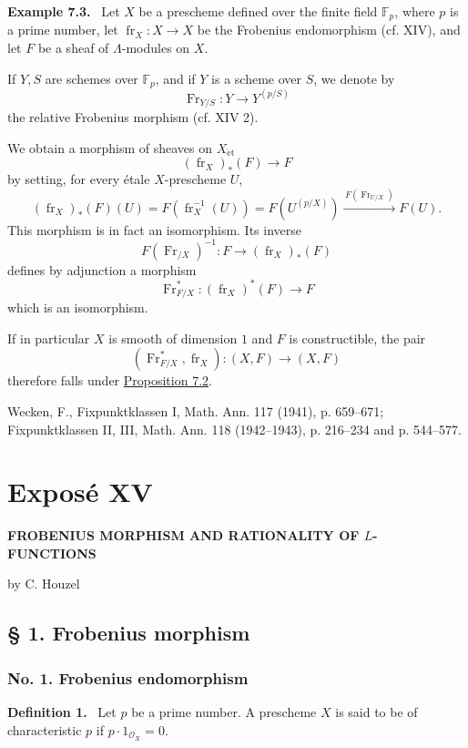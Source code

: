 \documentclass[11pt]{article}
\newenvironment{statement}[1]{\par\medskip\noindent\textbf{#1.}\ }{\par\medskip}
\providecommand{\et}{\mathrm{\acute{e}t}}
\providecommand{\OO}{\mathcal{O}}
\providecommand{\fr}{\operatorname{fr}}
\providecommand{\Fr}{\operatorname{Fr}}
\providecommand{\Fr}{\operatorname{Fr}}
\providecommand{\fr}{\operatorname{fr}}
\providecommand{\et}{\acute{e}t}
\begin{document}
\label{sga5:XII:example:7.3}\begin{statement}{Example 7.3}
Let $X$ be a prescheme defined over the finite field $\mathbb F_p$, where $p$ is a prime number, let $\fr_X:X\to X$ be the Frobenius endomorphism (cf. XIV), and let $F$ be a sheaf of $\Lambda$-modules on $X$.

If $Y,S$ are schemes over $\mathbb F_p$, and if $Y$ is a scheme over $S$, we denote by
\[
\Fr_{Y/S}:Y\longrightarrow Y^{(p/S)}
\]
the relative Frobenius morphism (cf. XIV 2).

We obtain a morphism of sheaves on $X_{\et}$
\[
(\fr_X)_*(F)\longrightarrow F
\]
by setting, for every étale $X$-prescheme $U$,
\[
(\fr_X)_*(F)(U)=F(\fr_X^{-1}(U))=F(U^{(p/X)})
 \xrightarrow{\,F(\Fr_{U/X})\,}F(U).
\]
This morphism is in fact an isomorphism. Its inverse
\[
F(\Fr_{/X})^{-1}:F\longrightarrow (\fr_X)_*(F)
\]
defines by adjunction a morphism
\[
\Fr_{F/X}^*:(\fr_X)^*(F)\longrightarrow F
\]
which is an isomorphism.

If in particular $X$ is smooth of dimension $1$ and $F$ is constructible, the pair
\[
(\Fr_{F/X}^*,\fr_X):(X,F)\longrightarrow (X,F)
\]
therefore falls under \hyperref[sga5:XII:proposition:7.2]{Proposition 7.2}.
\end{statement}

\noindent[1] Wecken, F., Fixpunktklassen I, Math. Ann. 117 (1941), p. 659--671; Fixpunktklassen II, III, Math. Ann. 118 (1942--1943), p. 216--234 and p. 544--577.

\label{sga5:XV:expose:xv}\section*{Exposé XV}
\begin{center}
\Large\bfseries FROBENIUS MORPHISM AND RATIONALITY OF $L$-FUNCTIONS

\medskip
by C. Houzel
\end{center}

\subsection*{§ 1. Frobenius morphism}

\subsubsection*{No. 1. Frobenius endomorphism}

\label{sga5:XV:definition:1}\begin{statement}{Definition 1}
Let $p$ be a prime number. A prescheme $X$ is said to be of characteristic $p$ if $p\cdot 1_{\OO_X}=0$.
\end{statement}
\end{document}
